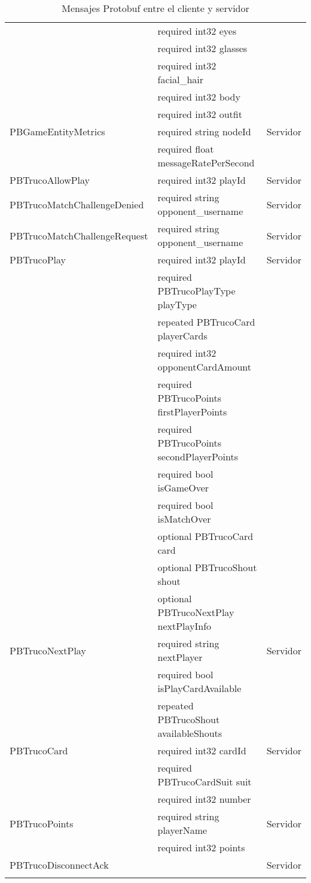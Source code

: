 \begin{longtable}{|p{}|p{}|p{}|}
                            & required int32 eyes & \\
                            & required int32 glasses & \\
                            & required int32 facial\_hair & \\
                            & required int32 body & \\
                            & required int32 outfit & \\
    \hline
    PBGameEntityMetrics & required string nodeId & Servidor \\
                        & required float messageRatePerSecond & \\
    \hline
    PBTrucoAllowPlay & required int32 playId & Servidor \\
    \hline
    PBTrucoMatchChallengeDenied & required string opponent\_username & Servidor \\
    \hline
    PBTrucoMatchChallengeRequest & required string opponent\_username & Servidor \\
    \hline
    PBTrucoPlay & required int32 playId & Servidor \\
                & required PBTrucoPlayType playType & \\
                & repeated PBTrucoCard playerCards & \\
                & required int32 opponentCardAmount & \\
                & required PBTrucoPoints firstPlayerPoints & \\
                & required PBTrucoPoints secondPlayerPoints & \\
                & required bool isGameOver & \\
                & required bool isMatchOver & \\
                & optional PBTrucoCard card & \\
                & optional PBTrucoShout shout & \\
                & optional PBTrucoNextPlay nextPlayInfo & \\
    \hline
    PBTrucoNextPlay & required string nextPlayer & Servidor \\
                    & required bool isPlayCardAvailable & \\
                    & repeated PBTrucoShout availableShouts & \\
    \hline
    PBTrucoCard & required int32 cardId & Servidor \\
                & required PBTrucoCardSuit suit & \\
                & required int32 number & \\
    \hline
    PBTrucoPoints & required string playerName & Servidor \\
                    & required int32 points & \\
    \hline
    PBTrucoDisconnectAck &  & Servidor \\
    \hline
    \caption{Mensajes Protobuf entre el cliente y servidor} \\
\end{longtable}
